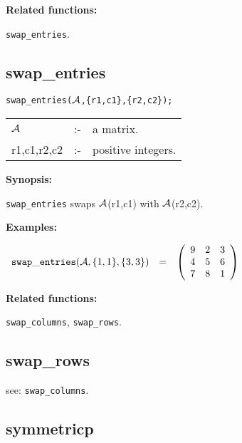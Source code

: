 {\bf Related functions:}

\hspace*{0.175in} {\tt swap\_entries}.


\subsection{swap\_entries}


\hspace*{0.175in} {\tt swap\_entries(${\cal A}$,\{r1,c1\},\{r2,c2\});}

\hspace*{0.1in}  
\begin{tabular}{l l l} 
${\cal A}$  &:-& a matrix. \\
r1,c1,r2,c2 &:-& positive integers.
\end{tabular}

{\bf Synopsis:} %

\hspace*{0.175in} {\tt swap\_entries} swaps ${\cal A}$(r1,c1) with 
                ${\cal A}$(r2,c2).

{\bf Examples:}

\begin{flushleft}  
\hspace*{0.1in}
\begin{math}  
\begin{array}{ccc}
{\tt swap\_entries}({\cal A},\{1,1\},\{3,3\}) & = & 
        \left( \begin{array}{ccc} 9 & 2 & 3 \\ 4 & 5 & 6 \\ 7 & 8 & 1
 \end{array} \right) 
\end{array}
\end{math}  
\end{flushleft}

{\bf Related functions:}

\hspace*{0.175in} {\tt swap\_columns}, {\tt swap\_rows}.


\subsection{swap\_rows}

\hspace*{0.175in} see: {\tt swap\_columns}.


\subsection{symmetricp}

